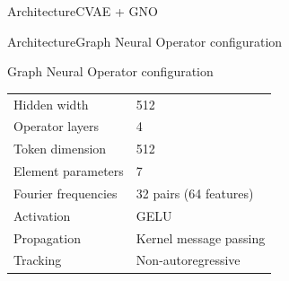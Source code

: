 \documentclass[aspectratio=169,t,11pt,table]{beamer}
{\setbeamercovered{transparent}}
\begin{document}
\begin{frame}{Architecture}{CVAE + GNO}
\begin{figure}
{
}
\vspace{0.5cm}
\end{figure}
\end{frame}
\begin{frame}{Architecture}{Graph Neural Operator configuration}
\begin{purpleBlock}{\centering\small{Graph Neural Operator configuration}}

\scriptsize

\begin{tabular}{ll}
Hidden width & 512 \\
Operator layers & 4 \\
Token dimension & 512 \\
Element parameters & 7 \\
Fourier frequencies & 32 pairs (64 features) \\
Activation & GELU \\
Propagation & Kernel message passing \\
Tracking & Non-autoregressive \\
\end{tabular}

\end{purpleBlock}
\end{frame}
\end{document}

